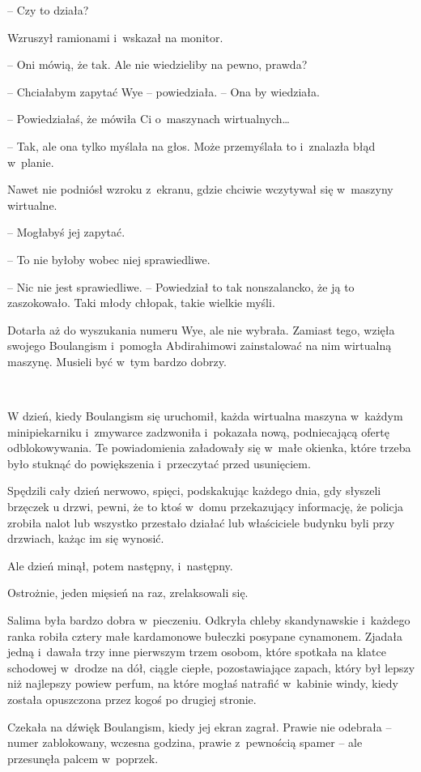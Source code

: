 \documentclass[oneside,polish,11pt,sfheadings]{mwbk}
\begin{document}
-- Czy to działa?

Wzruszył ramionami i~wskazał na monitor. 

-- Oni mówią, że tak. Ale nie
wiedzieliby na pewno, prawda?

-- Chciałabym zapytać Wye -- powiedziała. -- Ona by wiedziała.

-- Powiedziałaś, że mówiła Ci o~maszynach wirtualnych\ldots 

-- Tak, ale ona tylko myślała na głos. Może przemyślała to i~znalazła
błąd w~planie.

Nawet nie podniósł wzroku z~ekranu, gdzie chciwie wczytywał się w~maszyny wirtualne. 

-- Mogłabyś jej zapytać.

-- To nie byłoby wobec niej sprawiedliwe.

-- Nic nie jest sprawiedliwe. -- Powiedział to tak nonszalancko, że ją to
zaszokowało. Taki młody chłopak, takie wielkie myśli.

Dotarła aż do wyszukania numeru Wye, ale nie wybrała. Zamiast tego,
wzięła swojego Boulangism i~pomogła Abdirahimowi zainstalować na nim
wirtualną maszynę. Musieli być w~tym bardzo dobrzy.

~

W dzień, kiedy Boulangism się uruchomił, każda wirtualna maszyna w~każdym minipiekarniku i~zmywarce zadzwoniła i~pokazała nową,
podniecającą ofertę odblokowywania. Te powiadomienia załadowały się w~małe okienka, które trzeba było stuknąć do powiększenia i~przeczytać
przed usunięciem.

Spędzili cały dzień nerwowo, spięci, podskakując każdego dnia, gdy
słyszeli brzęczek u drzwi, pewni, że to ktoś w~domu przekazujący
informację, że policja zrobiła nalot lub wszystko przestało działać lub
właściciele budynku byli przy drzwiach, każąc im się wynosić.

Ale dzień minął, potem następny, i~następny.

Ostrożnie, jeden mięsień na raz, zrelaksowali się.

Salima była bardzo dobra w~pieczeniu. Odkryła chleby skandynawskie i~każdego ranka robiła cztery małe kardamonowe bułeczki posypane
cynamonem. Zjadała jedną i~dawała trzy inne pierwszym trzem osobom,
które spotkała na klatce schodowej w~drodze na dół, ciągle ciepłe,
pozostawiające zapach, który był lepszy niż najlepszy powiew perfum, na
które mogłaś natrafić w~kabinie windy, kiedy została opuszczona przez
kogoś po drugiej stronie.

Czekała na dźwięk Boulangism, kiedy jej ekran zagrał. Prawie nie
odebrała -- numer zablokowany, wczesna godzina, prawie z~pewnością spamer
-- ale przesunęła palcem w~poprzek.
\end{document}
